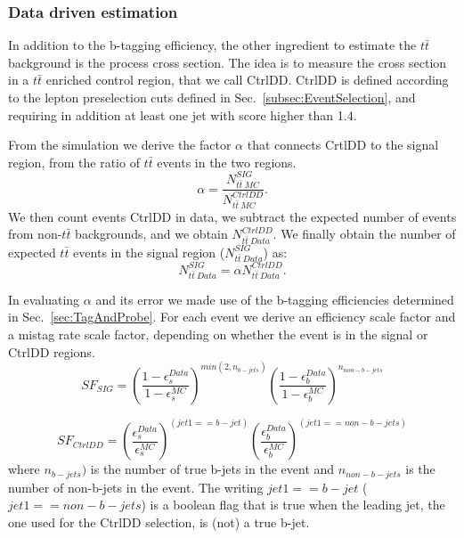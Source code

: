 \subsubsection{Data driven estimation \label{sec:DD}}
In addition to the b-tagging efficiency, the other ingredient to estimate the $t\bar{t}$ background is the process cross section. The idea is to measure the cross section in a $t\bar{t}$ enriched control region, that we call CtrlDD. CtrlDD is defined according to the lepton preselection cuts defined in Sec.~\ref{subsec:EventSelection}, and requiring in addition at least one jet with \jpb score higher than 1.4.

From the simulation we derive the factor $\alpha$ that connects CrtlDD to the signal region, from the ratio of $t\bar{t}$ events in the two regions.
\begin{equation}
\alpha=\frac{N_{t\bar{t}~MC}^{SIG}}{N_{t\bar{t}~MC}^{CtrlDD}}.
\end{equation}
We then count events CtrlDD in data, we subtract the expected number of events from non-$t\bar{t}$ backgrounds, and we obtain $N_{t\bar{t}~Data}^{CtrlDD}$. We finally obtain the number of expected $t\bar{t}$ events in the signal region ($N_{t\bar{t}~Data}^{SIG}$) as:
\begin{equation}
N_{t\bar{t}~Data}^{SIG} = \alpha{}N_{t\bar{t}~Data}^{CtrlDD}.
\end{equation}

In evaluating $\alpha$ and its error we made use of the b-tagging efficiencies determined in Sec.~\ref{sec:TagAndProbe}. 
For each event we derive an efficiency scale factor and a mistag rate scale factor, depending on whether the event is in the signal or CtrlDD regions.
\begin{equation}
\label{eq:sfsig}
SF_{SIG} = \left(\frac{1-\epsilon_{s}^{Data}}{1-\epsilon_{s}^{MC}}\right)^{min(2, n_{b-jets})} \left(\frac{1-\epsilon_{b}^{Data}}{1-\epsilon_{b}^{MC}}\right)^{n_{non-b-jets}} 
\end{equation}

\begin{equation}
\label{eq:sfbkg}
SF_{CtrlDD} = \left(\frac{\epsilon_{s}^{Data}}{\epsilon_{s}^{MC}}\right)^{(jet1 == b-jet)} \left(\frac{\epsilon_{b}^{Data}}{\epsilon_{b}^{MC}}\right)^{(jet1 == non-b-jets)} 
\end{equation}
where $n_{b-jets})$ is the number of true b-jets in the event and $n_{non-b-jets}$ is the number of non-b-jets in the event. The writing $jet1 == b-jet$ ($jet1 == non-b-jets$) is a boolean flag that is true when the leading jet, the one used for the CtrlDD selection, is (not) a true b-jet.

